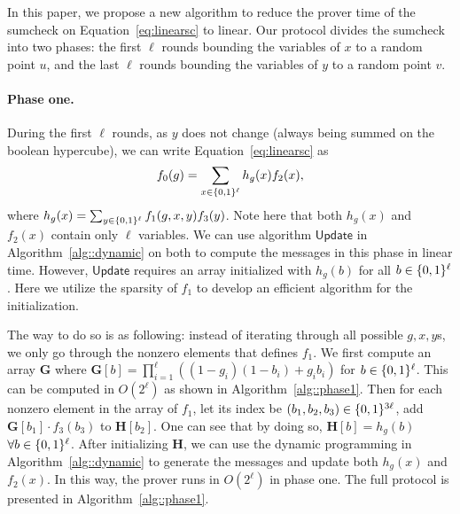 In this paper, we propose a new algorithm to reduce the prover time of the sumcheck on Equation~\ref{eq:linearsc} to linear. Our protocol divides the sumcheck into two phases: the first $\ell$ rounds bounding the variables of $x$ to a random point $u$, and the last $\ell$ rounds bounding the variables of $y$ to a random point $v$.

\paragraph{Phase one.} 
During the first $\ell$ rounds, as $y$ does not change (always being summed on the boolean hypercube), we can write Equation~\ref{eq:linearsc} as 
\[
f_0(g) = \sum_{x\in\{0,1\}^\ell} h_g(x)f_2(x),
\]
where $h_g(x) = \sum_{y\in\{0,1\}^\ell}f_1(g,x,y)f_3(y)$. Note here that both $h_g(x)$ and $f_2(x)$ contain only $\ell$ variables. We can use algorithm $\mathsf{Update}$ in Algorithm~\ref{alg::dynamic} on both to compute the messages in this phase in linear time. However, $\mathsf{Update}$ requires an array initialized with $h_g(b)$ for all $b\in\{0,1\}^\ell$. Here we utilize the sparsity of $f_1$ to develop an efficient algorithm for the initialization.

The way to do so is as following: instead of iterating through all possible $g,x,y$s, we only go through the nonzero elements that defines $f_1$. We first compute an array \textbf{G} where $\textbf{G}[b] = \prod_{i=1}^\ell ((1-g_i)(1-b_i)+g_ib_i)$ for $b\in\{0,1\}^\ell$. This can be computed in $O(2^\ell)$ as shown in Algorithm~\ref{alg::phase1}. Then for each nonzero element in the array of $f_1$, let its index be $(b_1,b_2,b_3) \in\{0,1\}^{3\ell}$, add $\textbf{G}[b_1]\cdot f_3(b_3)$ to $\textbf{H}[b_2]$. One can see that by doing so, $\textbf{H}[b] = h_g(b)$ $\forall b\in\{0,1\}^\ell$. After initializing $\textbf{H}$, we can use the dynamic programming in Algorithm~\ref{alg::dynamic} to generate the messages and update both $h_g(x)$ and $f_2(x)$. In this way, the prover runs in $O(2^\ell)$ in phase one. The full protocol is presented in Algorithm~\ref{alg::phase1}.

